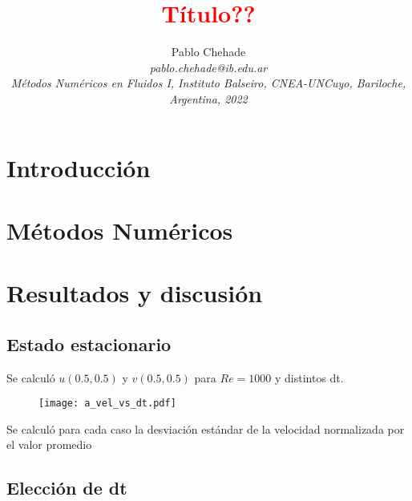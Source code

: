\documentclass[aps,prb,twocolumn,superscriptaddress,floatfix,longbibliography,10pt]{revtex4-2}
\newcounter{para}
\begin{document}
\newcommand{\mytitle}{\textcolor{red}{Título??}}

\title{\mytitle}

\author{Pablo Chehade \\
    \small \textit{pablo.chehade@ib.edu.ar} \\
    \small \textit{Métodos Numéricos en Fluidos I, Instituto Balseiro, CNEA-UNCuyo, Bariloche, Argentina, 2022} \\}


\begin{abstract}

\end{abstract}

\maketitle

\section{Introducción}

\section{Métodos Numéricos}

\section{Resultados y discusión}

\subsection{Estado estacionario}

Se calculó $u(0.5,0.5)$ y $v(0.5,0.5)$ para $Re = 1000$ y distintos dt.

\begin{figure}[h]
  \texttt{[image: a\_vel\_vs\_dt.pdf]}
  \caption{}
   \label{fig:a_vel_vs_dt}
\end{figure}

Se calculó para cada caso la desviación estándar de la velocidad normalizada por el valor promedio

\subsection{Elección de dt}
\end{document}
